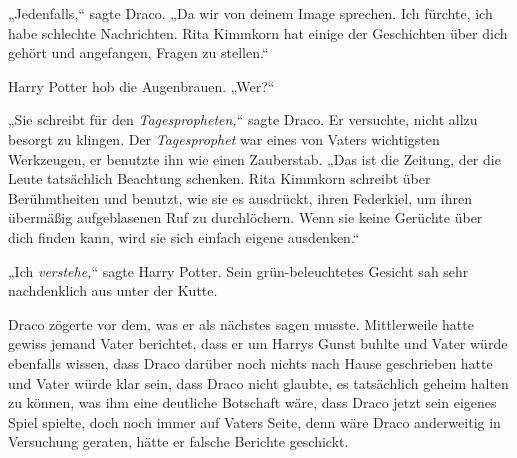 „Jedenfalls,“ sagte Draco. „Da wir von deinem Image sprechen. Ich fürchte, ich habe schlechte Nachrichten. Rita Kimmkorn hat einige der Geschichten über dich gehört und angefangen, Fragen zu stellen.“

Harry Potter hob die Augenbrauen. „Wer?“

„Sie schreibt für den \emph{Tagespropheten,}“ sagte Draco. Er versuchte, nicht allzu besorgt zu klingen. Der \emph{Tagesprophet} war eines von Vaters wichtigsten Werkzeugen, er benutzte ihn wie einen Zauberstab. „Das ist die Zeitung, der die Leute tatsächlich Beachtung schenken. Rita Kimmkorn schreibt über Berühmtheiten und benutzt, wie sie es ausdrückt, ihren Federkiel, um ihren übermäßig aufgeblasenen Ruf zu durchlöchern. Wenn sie keine Gerüchte über dich finden kann, wird sie sich einfach eigene ausdenken.“

„Ich \emph{verstehe,}“ sagte Harry Potter. Sein grün-beleuchtetes Gesicht sah sehr nachdenklich aus unter der Kutte.

Draco zögerte vor dem, was er als nächstes sagen musste. Mittlerweile hatte gewiss jemand Vater berichtet, dass er um Harrys Gunst buhlte und Vater würde ebenfalls wissen, dass Draco darüber noch nichts nach Hause geschrieben hatte und Vater würde klar sein, dass Draco nicht glaubte, es tatsächlich geheim halten zu können, was ihm eine deutliche Botschaft wäre, dass Draco jetzt sein eigenes Spiel spielte, doch noch immer auf Vaters Seite, denn wäre Draco anderweitig in Versuchung geraten, hätte er falsche Berichte geschickt.

